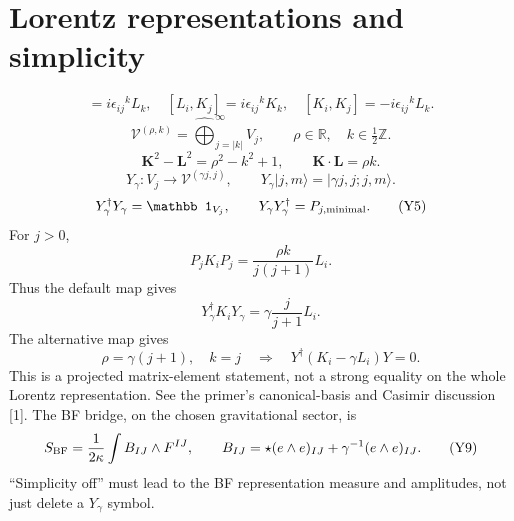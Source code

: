 \documentclass[11pt,a4paper]{article}
\newcommand{\ket}[1]{\lvert #1\rangle}
\newcommand{\eq}[2]{\begin{equation}#2\tag{#1}\end{equation}}
\begin{document}
\section{Lorentz representations and simplicity}
\eq{Y1}{[L_i,L_j]=i\epsilon_{ij}{}^kL_k,\quad[L_i,K_j]=i\epsilon_{ij}{}^kK_k,\quad[K_i,K_j]=-i\epsilon_{ij}{}^kL_k.}
\eq{Y2}{\mathcal V^{(\rho,k)}=\widehat{\bigoplus}_{j=|k|}^\infty V_j,\qquad\rho\in\mathbb R,\quad k\in\tfrac12\mathbb Z.}
\eq{Y3}{\mathbf K^2-\mathbf L^2=\rho^2-k^2+1,\qquad\mathbf K\cdot\mathbf L=\rho k.}
\eq{Y4}{Y_\gamma:V_j\longrightarrow\mathcal V^{(\gamma j,j)},\qquad Y_\gamma\ket{j,m}=\ket{\gamma j,j;j,m}.}
\eq{Y5}{Y_\gamma^\dagger Y_\gamma=\mathbb1_{V_j},\qquad Y_\gamma Y_\gamma^\dagger=P_{j,{\rm minimal}}.}
For $j>0$,
\eq{Y6}{P_jK_iP_j=\frac{\rho k}{j(j+1)}L_i.}
Thus the default map gives
\eq{Y7}{Y_\gamma^\dagger K_iY_\gamma=\gamma\frac{j}{j+1}L_i.}
The alternative map gives
\eq{Y8}{\rho=\gamma(j+1),\quad k=j\quad\Longrightarrow\quad Y^\dagger(K_i-\gamma L_i)Y=0.}
This is a projected matrix-element statement, not a strong equality on the whole Lorentz representation. See the primer's canonical-basis and Casimir discussion [1].
The BF bridge, on the chosen gravitational sector, is
\eq{Y9}{S_{\rm BF}=\frac1{2\kappa}\int B_{IJ}\wedge F^{IJ},\qquad B_{IJ}=\star(e\wedge e)_{IJ}+\gamma^{-1}(e\wedge e)_{IJ}.}
``Simplicity off'' must lead to the BF representation measure and amplitudes, not just delete a $Y_\gamma$ symbol.
\end{document}
